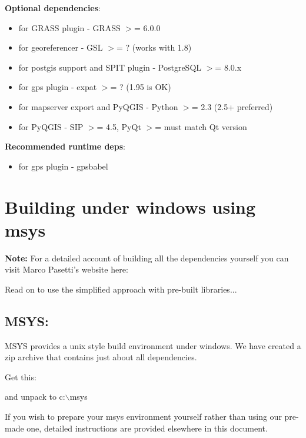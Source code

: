 \textbf{Optional dependencies}:

\begin{itemize}
\item for GRASS plugin - GRASS $>$= 6.0.0
\item for georeferencer - GSL $>$= ? (works with 1.8)
\item for postgis support and SPIT plugin - PostgreSQL $>$= 8.0.x
\item for gps plugin - expat $>$= ? (1.95 is OK)
\item for mapserver export and PyQGIS - Python $>$= 2.3 (2.5+ preferred)
\item for PyQGIS - SIP $>$= 4.5, PyQt $>$= must match Qt version
\end{itemize}

\textbf{Recommended runtime deps}:

\begin{itemize}
\item for gps plugin - gpsbabel
\end{itemize}

\section{Building under windows using msys}\label{sec:install_windows}
\textbf{Note:} For a detailed account of building all the dependencies yourself you 
can visit Marco Pasetti's website here:


Read on to use the simplified approach with pre-built libraries...

\subsection{MSYS:}
MSYS provides a unix style build environment under windows. We have created a
zip archive that contains just about all dependencies.

Get this: 


and unpack to c:$\backslash$msys

If you wish to prepare your msys environment yourself rather than using 
our pre-made one, detailed instructions are provided elsewhere in this
document.

